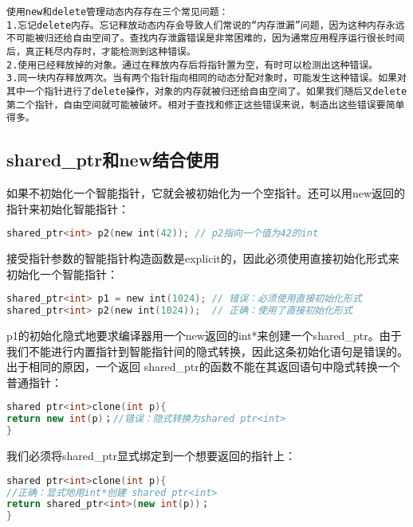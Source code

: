 \documentclass[
  a4paper,
  oneside,tablecaptionabove
]{scrbook}
\begin{document}
\begin{lstlisting}
使用new和delete管理动态内存存在三个常见问题：
1.忘记delete内存。忘记释放动态内存会导致人们常说的“内存泄漏”问题，因为这种内存永远不可能被归还给自由空间了。查找内存泄露错误是非常困难的，因为通常应用程序运行很长时间后，真正耗尽内存时，才能检测到这种错误。
2.使用已经释放掉的对象。通过在释放内存后将指针置为空，有时可以检测出这种错误。
3.同一块内存释放两次。当有两个指针指向相同的动态分配对象时，可能发生这种错误。如果对其中一个指针进行了delete操作，对象的内存就被归还给自由空间了。如果我们随后又delete第二个指针，自由空间就可能被破坏。相对于查找和修正这些错误来说，制造出这些错误要简单得多。
\end{lstlisting}

\subsection{shared\_ptr和new结合使用}\label{shared_ptrux548cnewux7ed3ux5408ux4f7fux7528}

如果不初始化一个智能指针，它就会被初始化为一个空指针。还可以用new返回的指针来初始化智能指针：

\begin{lstlisting}[language={C++}]
shared_ptr<int> p2(new int(42)); // p2指向一个值为42的int
\end{lstlisting}

接受指针参数的智能指针构造函数是explicit的，因此必须使用直接初始化形式来初始化一个智能指针：

\begin{lstlisting}[language={C++}]
shared_ptr<int> p1 = new int(1024); // 错误：必须使用直接初始化形式
shared_ptr<int> p2(new int(1024));  // 正确：使用了直接初始化形式
\end{lstlisting}

p1的初始化隐式地要求编译器用一个new返回的int*来创建一个shared\_ptr。由于我们不能进行内置指针到智能指针间的隐式转换，因此这条初始化语句是错误的。出于相同的原因，一个返回
shared\_ptr的函数不能在其返回语句中隐式转换一个普通指针：

\begin{lstlisting}[language={C++}]
shared ptr<int>clone(int p){
return new int(p)；//错误：隐式转换为shared ptr<int>
}
\end{lstlisting}

我们必须将shared\_ptr显式绑定到一个想要返回的指针上：

\begin{lstlisting}[language={C++}]
shared ptr<int>clone(int p){
//正确：显式地用int*创建 shared ptr<int>
return shared_ptr<int>(new int(p))；
}
\end{lstlisting}
\end{document}
